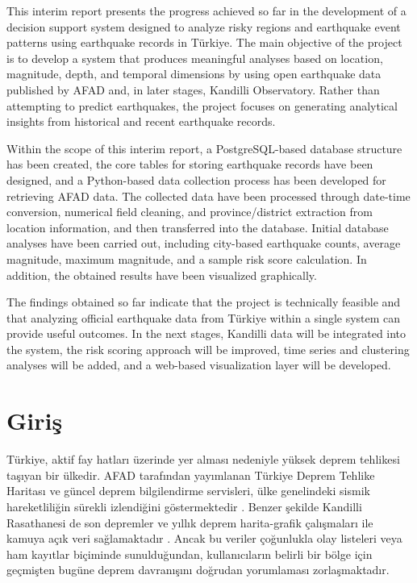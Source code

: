 \documentclass[12pt,a4paper]{report}
\begin{document}
This interim report presents the progress achieved so far in the development of a decision
support system designed to analyze risky regions and earthquake event patterns using earthquake
records in Türkiye. The main objective of the project is to develop a system that produces
meaningful analyses based on location, magnitude, depth, and temporal dimensions by using
open earthquake data published by AFAD and, in later stages, Kandilli Observatory. Rather than
attempting to predict earthquakes, the project focuses on generating analytical insights from
historical and recent earthquake records.

Within the scope of this interim report, a PostgreSQL-based database structure has been created,
the core tables for storing earthquake records have been designed, and a Python-based data
collection process has been developed for retrieving AFAD data. The collected data have been
processed through date-time conversion, numerical field cleaning, and province/district extraction
from location information, and then transferred into the database. Initial database analyses have
been carried out, including city-based earthquake counts, average magnitude, maximum magnitude,
and a sample risk score calculation. In addition, the obtained results have been visualized
graphically.

The findings obtained so far indicate that the project is technically feasible and that analyzing
official earthquake data from Türkiye within a single system can provide useful outcomes.
In the next stages, Kandilli data will be integrated into the system, the risk scoring approach
will be improved, time series and clustering analyses will be added, and a web-based visualization
layer will be developed.

\clearpage

\tableofcontents
\clearpage

\listoffigures
{}
\clearpage

\listoftables
{}
\clearpage

\chapter{Giriş}

Türkiye, aktif fay hatları üzerinde yer alması nedeniyle yüksek deprem tehlikesi taşıyan
bir ülkedir. AFAD tarafından yayımlanan Türkiye Deprem Tehlike Haritası ve güncel deprem
bilgilendirme servisleri, ülke genelindeki sismik hareketliliğin sürekli izlendiğini
göstermektedir \cite{afad_harita, afad_son}. Benzer şekilde Kandilli Rasathanesi de son
depremler ve yıllık deprem harita-grafik çalışmaları ile kamuya açık veri sağlamaktadır
\cite{kandilli_son, kandilli_yillik}. Ancak bu veriler çoğunlukla olay listeleri veya ham
kayıtlar biçiminde sunulduğundan, kullanıcıların belirli bir bölge için geçmişten bugüne
deprem davranışını doğrudan yorumlaması zorlaşmaktadır.
\end{document}
